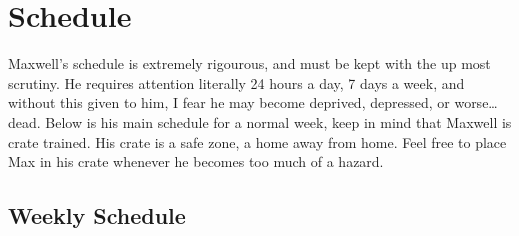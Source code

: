 \documentclass[pdftex,12pt]{article}
\begin{document}
\newpage
\section{Schedule}

Maxwell's schedule is extremely rigourous, and must be kept with the up most
scrutiny. He requires attention literally 24 hours a day, 7 days a week, and
without this given to him, I fear he may become deprived, depressed, or
worse\ldots dead. Below is his main schedule for a normal week, keep in mind that
Maxwell is crate trained. His crate is a safe zone, a home away from home. Feel
free to place Max in his crate whenever he becomes too much of a hazard.

\subsection{Weekly Schedule}
\end{document}
